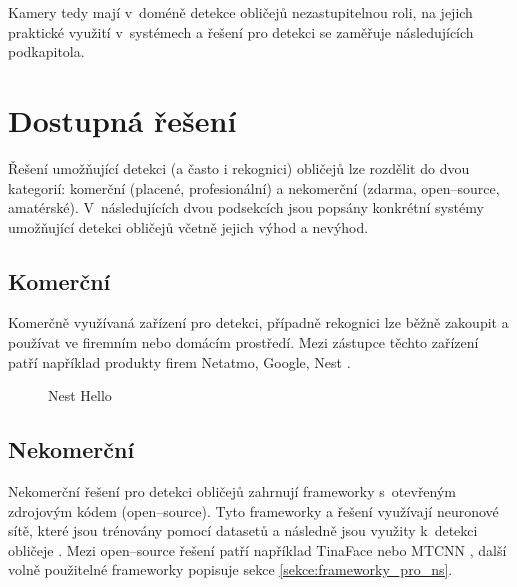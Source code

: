 Kamery tedy mají v~doméně detekce obličejů nezastupitelnou roli, na 
jejich praktické využití v~systémech a řešení pro detekci se zaměřuje následujících
podkapitola.

\section{Dostupná řešení}
Řešení umožňující detekci (a často i rekognici) obličejů lze rozdělit do dvou kategorií: 
komerční (placené, profesionální) a nekomerční (zdarma, open--source, amatérské).
V~následujících dvou podsekcích jsou popsány konkrétní systémy umožňující
detekci obličejů včetně jejich výhod a nevýhod.

\subsection*{Komerční}
Komerčně využívaná zařízení pro detekci, případně rekognici lze běžně zakoupit 
a používat ve firemním nebo domácím prostředí. Mezi zástupce těchto zařízení
patří například produkty firem Netatmo, Google, Nest \cite{securityCamsWeb2}.

\begin{figure}[H]
  \begin{center}
  \label{nest}
  \caption{Nest Hello \cite{securityCamsWeb2}}
  \end{center}
\end{figure}

\subsection*{Nekomerční}
Nekomerční řešení pro detekci obličejů zahrnují frameworky s~otevřeným zdrojovým
kódem (open--source). Tyto frameworky a řešení využívají neuronové sítě, které jsou trénovány
pomocí datasetů a následně jsou využity k~detekci obličeje 
\cite{faceRecognitionFrameworks}.
Mezi open--source řešení patří například TinaFace \cite{TinaFace} nebo MTCNN \cite{MTCNN}, další volně použitelné frameworky popisuje sekce \ref{sekce:frameworky_pro_ns}.


